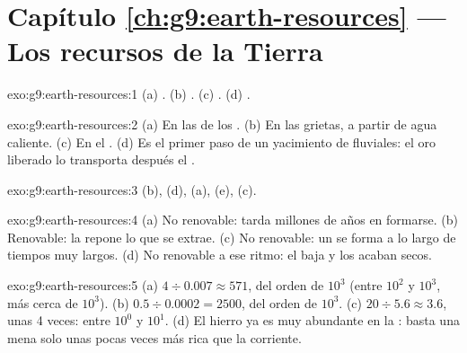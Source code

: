 \section*{Capítulo \ref{ch:g9:earth-resources} --- Los recursos de la Tierra}

\begin{solution}{exo:g9:earth-resources:1}
(a) . (b) . (c) . (d) .
\end{solution}

\begin{solution}{exo:g9:earth-resources:2}
(a) En las  de los . (b) En las grietas, a partir de agua
caliente. (c) En el . (d) Es el primer paso de un yacimiento de
 fluviales: el oro liberado lo transporta después el .
\end{solution}

\begin{solution}{exo:g9:earth-resources:3}
(b), (d), (a), (e), (c).
\end{solution}

\begin{solution}{exo:g9:earth-resources:4}
(a) No renovable: tarda millones de años en formarse. (b) Renovable: la
 repone lo que se extrae. (c) No renovable: un  se
forma a lo largo de tiempos muy largos. (d) No renovable a ese ritmo: el
 baja y los  acaban secos.
\end{solution}

\begin{solution}{exo:g9:earth-resources:5}
(a) $4 \div 0.007 \approx 571$, del orden de $10^3$ (entre $10^2$ y
$10^3$, más cerca de $10^3$). (b) $0.5 \div 0.0002 = 2500$, del orden de
$10^3$. (c) $20
\div 5.6 \approx 3.6$, unas 4 veces: entre $10^0$ y $10^1$.
(d) El hierro ya es muy abundante en la : basta una mena solo unas
pocas veces más rica que la  corriente.
\end{solution}

